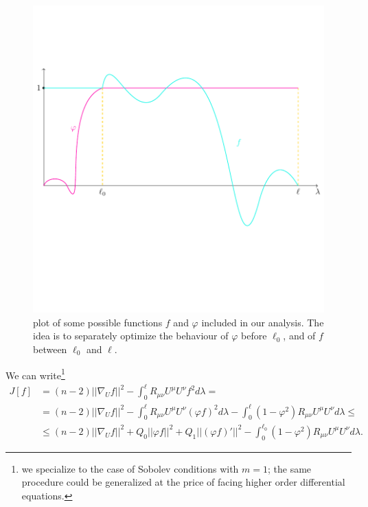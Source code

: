 \begin{figure}
    \centering
    \includegraphics[scale=0.6]{Immagini/euler-lagrange-functions/euler-lagrange-functions.pdf}
    \caption[]{plot of some possible functions \(f\) and \(\varphi\) included in our analysis. The idea is to separately optimize the behaviour of \(\varphi\) before \(\ell_0\), and of \(f\) between \(\ell_0\) and \(\ell\).}
\end{figure}
We can write\footnote{we specialize to the case of Sobolev conditions with \(m = 1\); the same procedure could be generalized at the price of facing higher order differential equations.}
\begin{align*}
    J[f] &= (n - 2)\vert\vert\nabla_U f \vert\vert^2 - \int_0^{\ell} R_{\mu\nu}U^{\mu}U^{\nu} f^2 d\lambda =\\
    &= (n - 2)\vert\vert\nabla_U f \vert\vert^2 - \int_0^{\ell} R_{\mu\nu}U^{\mu}U^{\nu} \left(\varphi f\right)^2 d\lambda - \int_0^{\ell} \left(1 - \varphi^2\right) R_{\mu\nu}U^{\mu}U^{\nu} d\lambda \le \\
    &\le (n - 2)\vert\vert\nabla_U f \vert\vert^2 + Q_0\vert\vert\varphi f\vert\vert^2 + Q_1\vert\vert\left(\varphi f\right)'\vert\vert^2 - \int_0^{\ell_0} \left(1 - \varphi^2\right) R_{\mu\nu}U^{\mu}U^{\nu} d\lambda.
\end{align*}
